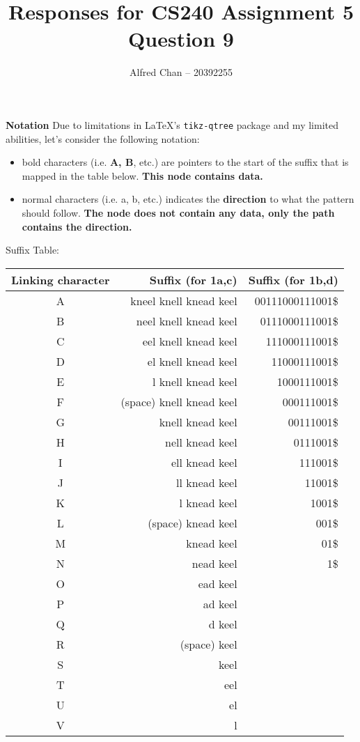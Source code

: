 \documentclass[12pt]{article}
\title{Responses for CS240 Assignment 5 Question 9}
\author{Alfred Chan -- 20392255}
\begin{document}
\maketitle

{\bf Notation} Due to limitations in \LaTeX's \texttt{tikz-qtree} package and my limited abilities, let's consider the following notation:
\begin{itemize}
\item bold characters (i.e. {\bf A, B}, etc.) are pointers to the start of the suffix that is mapped in the table below. {\bf This node contains data.}
\item normal characters (i.e. a, b, etc.) indicates the {\bf direction} to what the pattern should follow. {\bf The node does not contain any data, only the path contains the direction.}
\end{itemize}

Suffix Table:\\
\begin{tabular}{c|r|r}
Linking character & Suffix (for 1a,c) & Suffix (for 1b,d)\\\hline
A & kneel knell knead keel		& 00111000111001\$\\\hline
B & neel knell knead keel			& 0111000111001\$\\\hline
C & eel knell knead keel			& 111000111001\$\\\hline
D & el knell knead keel				& 11000111001\$\\\hline
E & l knell knead keel				& 1000111001\$\\\hline
F & (space) knell knead keel	& 000111001\$\\\hline
G & knell knead keel					& 00111001\$\\\hline
H & nell knead keel						& 0111001\$\\\hline
I & ell knead keel						& 111001\$\\\hline
J & ll knead keel							& 11001\$\\\hline
K & l knead keel							& 1001\$\\\hline
L & (space) knead keel				& 001\$\\\hline
M & knead keel								& 01\$\\\hline
N & nead keel									& 1\$\\\hline
O & ead keel\\\hline
P & ad keel\\\hline
Q & d keel\\\hline
R & (space) keel\\\hline
S & keel\\\hline
T & eel\\\hline
U & el\\\hline
V & l\\\hline
\end{tabular}\\
\end{document}
